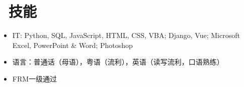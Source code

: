 \documentclass{resume}
\begin{document}


\section{\faCogs\ 技能}
\begin{itemize}[parsep=0.5ex]
  \item IT: Python, SQL, JavaScript, HTML, CSS, VBA; Django, Vue; Microsoft Excel, PowerPoint \& Word; Photoshop
  \item 语言：普通话（母语），粤语（流利），英语（读写流利，口语熟练）
  \item FRM一级通过
\end{itemize}
\end{document}
